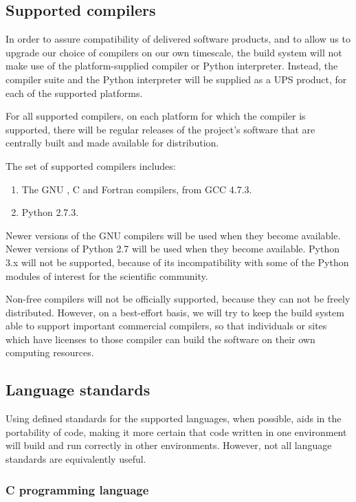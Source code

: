 \documentclass[draftmode,draftwater]{memarticle}
\begin{document}
\subsection{Supported compilers}

In order to assure compatibility of delivered software products, and to
allow us to upgrade our choice of compilers on our own timescale, the
build system will not make use of the platform-supplied compiler or
Python interpreter. Instead, the compiler suite and the Python
interpreter will be supplied as a UPS product, for each of the supported
platforms.

For all supported compilers, on each platform for which the compiler is
supported, there will be regular releases of the project's software that
are centrally built and made available for distribution.

The set of supported compilers includes:
\begin{enumerate}
  \item The GNU \cpp{}, C and Fortran compilers, from GCC 4.7.3.
  \item Python 2.7.3.
\end{enumerate}
Newer versions of the GNU compilers will be used when they become
available. Newer versions of Python 2.7 will be used when they become
available. Python 3.x will not be supported, because of its
incompatibility with some of the Python modules of interest for the
scientific community.

Non-free compilers will not be officially supported, because they can
not be freely distributed. However, on a best-effort basis, we will try
to keep the build system able to support important commercial compilers,
so that individuals or sites which have licenses to those compiler can
build the software on their own computing resources.

\subsection{Language standards}

Using defined standards for the supported languages, when possible, aids
in the portability of code, making it more certain that code written in
one environment will build and run correctly in other environments.
However, not all language standards are equivalently useful.

\subsubsection{C programming language}
\end{document}
